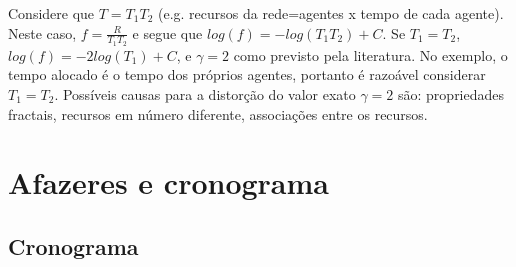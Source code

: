 \documentclass[a4paper,openright,12pt]{report} %
\begin{document}
Considere que $T=T_1 T_2$ 
(e.g. recursos da rede=agentes x tempo de cada agente). 
Neste caso,
$f=\frac{R}{T_1 T_2}$ e
segue que $log(f)=-log(T_1 T_2) +C$. Se $T_1=T_2$, 
$log(f)=-2 log(T_1) + C$, e
$\gamma=2$ como previsto pela literatura.
No exemplo, o tempo alocado
é o tempo dos próprios agentes,
portanto é razoável considerar $T_1=T_2$. 
Possíveis causas para a distorção do valor exato $\gamma=2$
são: propriedades fractais, recursos em número diferente, associações entre os recursos. 

\chapter{Afazeres e cronograma}

\section{Cronograma}\label{sec:cron}
\end{document}
